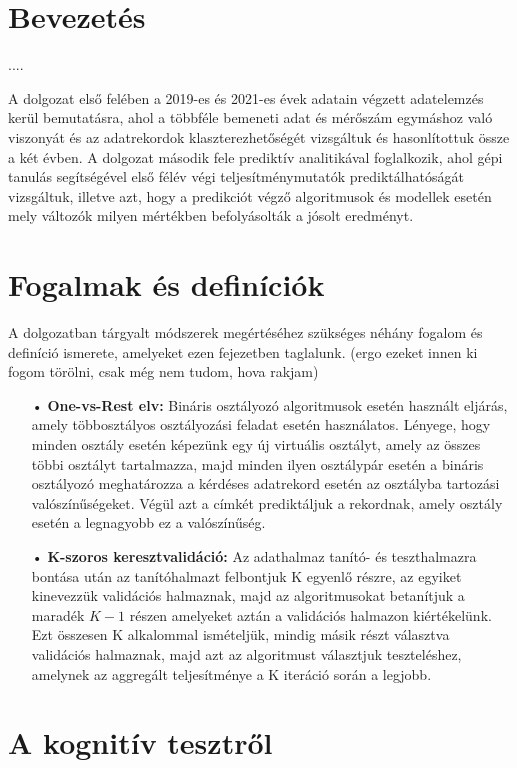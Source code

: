 \documentclass[12pt]{article}
\begin{document}
\tableofcontents


\section{Bevezetés}
....

A dolgozat első felében a 2019-es és 2021-es évek adatain végzett adatelemzés kerül bemutatásra, ahol a többféle bemeneti adat és mérőszám egymáshoz való viszonyát és az adatrekordok klaszterezhetőségét vizsgáltuk és hasonlítottuk össze a két évben. A dolgozat második fele prediktív analitikával foglalkozik, ahol gépi tanulás segítségével első félév végi teljesítménymutatók prediktálhatóságát vizsgáltuk, illetve azt, hogy a predikciót végző algoritmusok és modellek esetén mely változók milyen mértékben befolyásolták a jósolt eredményt.

\section{Fogalmak és definíciók}

A dolgozatban tárgyalt módszerek megértéséhez szükséges néhány fogalom és definíció ismerete, amelyeket ezen fejezetben taglalunk. (ergo ezeket innen ki fogom törölni, csak még nem tudom, hova rakjam)
\begin{itemize}
\item[•]\textbf{One-vs-Rest elv:} Bináris osztályozó algoritmusok esetén használt eljárás, amely többosztályos osztályozási feladat esetén használatos. Lényege, hogy minden osztály esetén képezünk egy új virtuális osztályt, amely az összes többi osztályt tartalmazza, majd minden ilyen osztálypár esetén a bináris osztályozó meghatározza a kérdéses adatrekord esetén az osztályba tartozási valószínűségeket. Végül azt a címkét prediktáljuk a rekordnak, amely osztály esetén a legnagyobb ez a valószínűség.
\item[•] \textbf{K-szoros keresztvalidáció:} Az adathalmaz tanító- és teszthalmazra bontása után az tanítóhalmazt felbontjuk K egyenlő részre, az egyiket kinevezzük validációs halmaznak, majd az algoritmusokat betanítjuk a maradék $K-1$ részen amelyeket aztán a validációs halmazon kiértékelünk. Ezt összesen K alkalommal ismételjük, mindig másik részt választva validációs halmaznak, majd azt az algoritmust választjuk teszteléshez, amelynek az aggregált teljesítménye a K iteráció során a legjobb.
\end{itemize}

\section{A kognitív tesztről}
\end{document}

